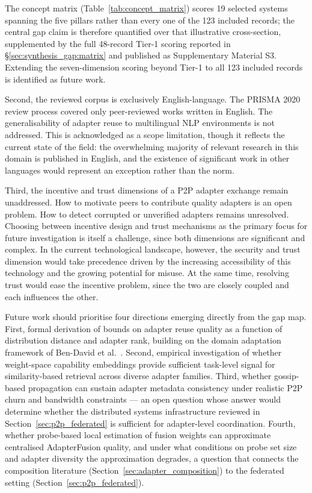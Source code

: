 The concept matrix (Table~\ref{tab:concept_matrix}) scores 19 selected systems
spanning the five pillars rather than every one of the 123 included records; the
central gap claim is therefore quantified over that illustrative cross-section,
supplemented by the full 48-record Tier-1 scoring reported in
\S\ref{sec:synthesis_gap:matrix} and published as Supplementary Material S3.
Extending the seven-dimension scoring beyond Tier-1 to all 123 included
records is identified as future work.

Second, the reviewed corpus is exclusively English-language. The PRISMA 2020 
review process covered only peer-reviewed works written in English. The 
generalisability of adapter reuse to multilingual NLP environments is not 
addressed. This is acknowledged as a scope limitation, though it reflects 
the current state of the field: the overwhelming majority of relevant 
research in this domain is published in English, and the existence of 
significant work in other languages would represent an exception rather 
than the norm.

Third, the incentive and trust dimensions of a P2P adapter exchange remain
unaddressed. How to motivate peers to contribute quality adapters is an 
open problem. How to detect corrupted or unverified adapters remains 
unresolved. Choosing between incentive design and trust mechanisms as the 
primary focus for future investigation is itself a challenge, since both 
dimensions are significant and complex. In the current technological 
landscape, however, the security and trust dimension would take precedence driven by the increasing accessibility of this technology and the 
growing potential for misuse. At the same time, resolving trust would 
ease the incentive problem, since the two are closely coupled and each 
influences the other.

Future work should prioritise four directions emerging directly from the gap
map. First, formal derivation of bounds on adapter reuse quality as a function 
of distribution distance and adapter rank, building on the domain adaptation 
framework of Ben-David et al.~\cite{BenDavid2010}. Second, empirical investigation of whether weight-space capability embeddings provide sufficient task-level signal for similarity-based retrieval across diverse adapter families.
Third, whether gossip-based propagation can sustain adapter metadata consistency under realistic P2P churn and bandwidth constraints — an open question whose answer would determine whether the distributed systems infrastructure reviewed in Section~\ref{sec:p2p_federated} is sufficient for adapter-level coordination. Fourth, whether probe-based local estimation of fusion weights can approximate centralised AdapterFusion quality, and under what conditions on probe set size and adapter diversity the approximation degrades, a question that connects the composition literature (Section~\ref{sec:adapter_composition}) to the federated setting (Section~\ref{sec:p2p_federated}).